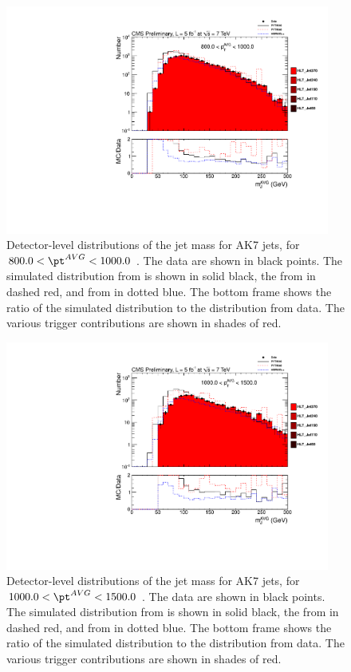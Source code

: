 \begin{figure}[htbp]
\centering
\includegraphics[width=0.95\textwidth]{figs/histAK7MjetVsPtAvg_rawDataMCComparisons_stacktrigs_pt_9}
\caption{Detector-level distributions of the jet mass for AK7 jets,
for $800.0 < \pt^{AVG} < 1000.0$ \GeVc. The data are shown in black points.
The simulated distribution from \PYTHIA is shown in solid black, 
the from \PYTHIAEIGHT in dashed red, and from \HERWIG in dotted blue. 
The bottom frame shows the ratio of the simulated distribution
to the distribution from data. The various trigger contributions are shown in shades of red.
\label{figs:histAK7MjetVsPtAvg_rawDataMCComparisons_stacktrigs_pt_9}}
\end{figure}



\begin{figure}[htbp]
\centering
\includegraphics[width=0.95\textwidth]{figs/histAK7MjetVsPtAvg_rawDataMCComparisons_stacktrigs_pt_10}
\caption{Detector-level distributions of the jet mass for AK7 jets,
for $1000.0 < \pt^{AVG} < 1500.0$ \GeVc. The data are shown in black points.
The simulated distribution from \PYTHIA is shown in solid black, 
the from \PYTHIAEIGHT in dashed red, and from \HERWIG in dotted blue. 
The bottom frame shows the ratio of the simulated distribution
to the distribution from data. The various trigger contributions are shown in shades of red.
\label{figs:histAK7MjetVsPtAvg_rawDataMCComparisons_stacktrigs_pt_10}}
\end{figure}

